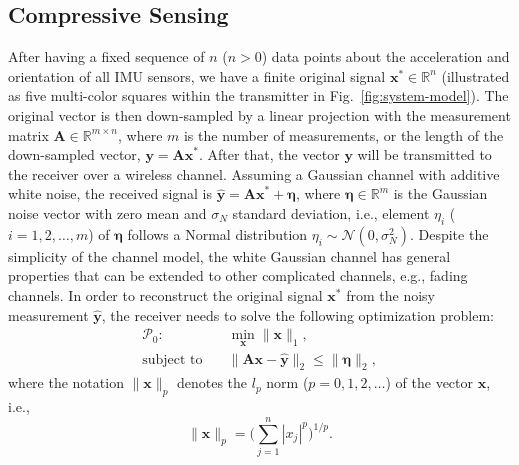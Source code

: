 \documentclass[conference, 10pt]{IEEEtran}
\begin{document}
\subsection{Compressive Sensing}
After having a fixed sequence of $n$ ($n > 0$) data points about the acceleration and orientation of all IMU sensors, we have a finite original signal $\mathbf{x}^* \in \mathbb{R}^n$ (illustrated as five multi-color squares within the transmitter in Fig.~\ref{fig:system-model}). The original vector is then down-sampled by a linear projection with the measurement matrix $\mathbf{A} \in \mathbb{R}^{m \times n}$, where $m$ is the number of measurements, or the length of the down-sampled vector, $\mathbf{y} = \mathbf{Ax}^*$. After that, the vector $\mathbf{y}$ will be transmitted to the receiver over a wireless channel. 
Assuming a Gaussian channel with additive white noise, the received signal is $\mathbf{\hat{y}} = \mathbf{Ax}^* + \bm{\eta}$, where $\bm{\eta} \in \mathbb{R}^m$ is the Gaussian noise vector with zero mean and $\sigma_N$ standard deviation, i.e., element $\eta_i$ ($i=1, 2, \ldots, m$) of $\bm{\eta}$ follows a Normal distribution $\eta_i \sim \mathcal{N}(0, \sigma_N^2)$. Despite the simplicity of the channel model, the white Gaussian channel has general properties that can be extended to other complicated channels, e.g., fading channels. 
In order to reconstruct the original signal $\mathbf{x}^*$ from the noisy measurement $\mathbf{\hat{y}}$, the receiver needs to solve the following optimization problem:
\begin{equation}
\begin{split}
\mathcal{P}_0: & \quad \min_{\mathbf{x}} \|\mathbf{x}\|_1, \\
\text{subject to} & \quad \|\mathbf{Ax} - \mathbf{\hat{y}}\|_2 \leq \|\bm{\eta}\|_2,
\end{split}
\label{eq:l1-min}
\end{equation} 
where the notation $\|\mathbf{x}\|_p$ denotes the $l_p$ norm ($p=0, 1, 2, \ldots$) of the vector $\mathbf{x}$, i.e.,
\begin{equation}
\label{eq:lp-norm}
\|\mathbf{x}\|_p = \Big(\sum_{j=1}^{n} |x_j|^p\Big)^{1/p}.
\end{equation}
\end{document}
